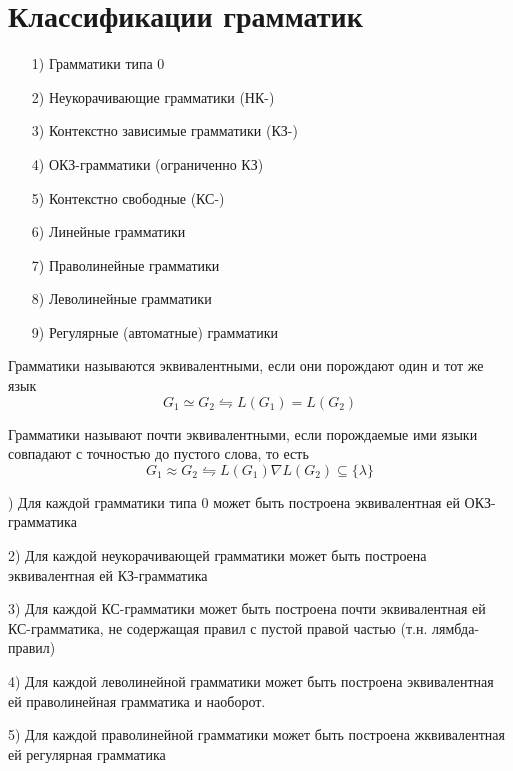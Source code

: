 

\title{}
\author{Козырнов Александр Дмитриевич, ИУ7-32Б}
\date{\today}


\section{Классификации грамматик}

\begin{enumerate}
    \item[1)] Грамматики типа 0
    \item[2)] Неукорачивающие грамматики (НК-)
    \item[3)] Контекстно зависимые грамматики (КЗ-)
    \item[4)] ОКЗ-грамматики (ограниченно КЗ)
    \item[5)] Контекстно свободные (КС-)
    \item[6)] Линейные грамматики
    \item[7)] Праволинейные грамматики
    \item[8)] Леволинейные грамматики
    \item[9)] Регулярные (автоматные) грамматики
\end{enumerate}

\begin{definition}
Грамматики называются эквивалентными, если они порождают один и тот же язык
\[
G_1 \simeq G_2 \leftrightharpoons L(G_1) = L(G_2)
\] 
\end{definition}

\begin{definition}
Грамматики называют почти эквивалентными, если порождаемые ими языки совпадают
с точностью до пустого слова, то есть
\[
G_1 \approx G_2 \leftrightharpoons L(G_1)\nabla L(G_2) \subseteq \{\lambda\} 
\] 
\end{definition}

\begin{theorem} ${}$) Для каждой грамматики типа 0 может быть построена эквивалентная ей ОКЗ-грамматика

2) Для каждой неукорачивающей грамматики может быть построена эквивалентная ей КЗ-грамматика

3) Для каждой КС-грамматики может быть построена почти эквивалентная ей КС-грамматика, не
содержащая правил с пустой правой частью (т.н. лямбда-правил)

4) Для каждой леволинейной грамматики может быть построена эквивалентная ей
праволинейная грамматика и наоборот.

5) Для каждой праволинейной грамматики может быть построена жквивалентная ей регулярная
грамматика
\end{theorem}

